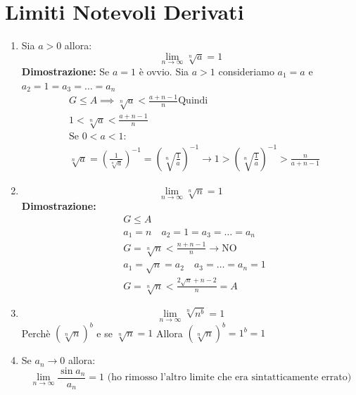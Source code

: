 \section{Limiti Notevoli Derivati}\label{limiti-notevoli}

\begin{enumerate}
\def\labelenumi{\arabic{enumi})}
\item
  Sia \(a>0\) allora:
\[\lim_{ n \to \infty } \sqrt[n]{ a }=1 \]
\textbf{Dimostrazione:}
Se \(a=1\) è ovvio.
Sia \(a>1\) consideriamo \(a_1=a\) e \(a_{2}=1=a_{3}=\dots=a_{n}\)
\begin{align} %
& G \leq A \implies \sqrt[n]{a} < \frac{a+n-1}{n} \text{Quindi }\\
& 1 < \sqrt[n]{a} < \frac{a+n-1}{n} \\
& \text{Se } 0<a<1: \\
& \sqrt[n]{a} = \left( \frac{1}{\sqrt[n]{a}} \right)^{-1}=\left( \sqrt[n]{\frac{1}{a}} \right)^{-1}\to 1 > \left( \sqrt[n]{\frac{1}{a}}\right)^{-1} > \frac{n}{a+n-1}
\end{align}

\item
  \[\lim_{ n \to \infty } \sqrt[n]n=1\]
  \textbf{Dimostrazione:}
  \begin{align} %
   & G\leq A \\
   & a_{1} = n \quad a_{2}=1=a_{3}=\dots=a_{n}\\
   & G = \sqrt[n] n < \frac{{n+n-1}}{n} \to \text{NO} \\
   & a_{1}=\sqrt n=a_{2} \quad a_{3}=\dots=a_{n}=1 \\
   & G = \sqrt[n] n < \frac{2\sqrt n + n -2}{n} = A
  \end{align}
\item
  \[\lim_{ n \to \infty } \sqrt[n]{ n^b }=1\] Perchè
  \((\sqrt[n]{ n})^b\) e se \(\sqrt[n]{n}=1\) Allora
  \((\sqrt[n]{ n})^b=1^b=1\)
\item
  Se \(a_{n}\to 0\) allora:
  \[\lim_{ n \to \infty } \frac{\sin a_{n}}{a_{n}} = 1 \text{ (ho rimosso l'altro limite che era sintatticamente errato)} \]
  

\end{enumerate}
